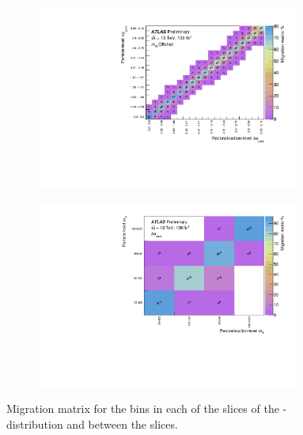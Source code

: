 \begin{figure}[htb]
  \begin{subfigure}{.49\textwidth}\centering\includegraphics[width = 0.95\textwidth]{Figures/m4l/UnfoldingStudies/v014_matrices/deltaPhiPairs_m4loffshellMatrix.pdf}\end{subfigure}
   \begin{subfigure}{.49\textwidth}\centering\includegraphics[width = 0.95\textwidth]{Figures/m4l/UnfoldingStudies/v014_matrices/deltaPhiPairs_m4lMatrix.pdf}\end{subfigure}
\caption{Migration matrix for the \dPhiPairs bins in each of the \mFourL slices of the \dPhiPairs-\mFourL distribution and between the slices.}
 \end{figure}


